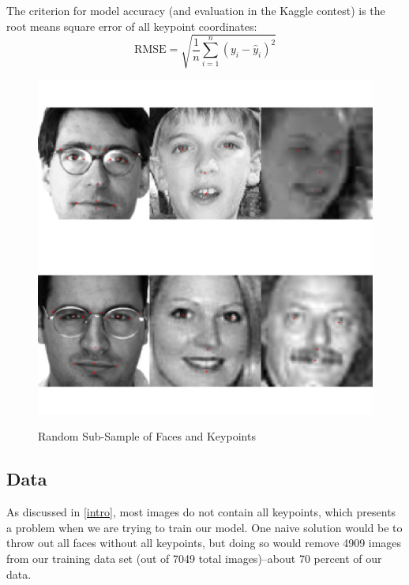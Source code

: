\documentclass[journal]{IEEEtran}
\begin{document}
The criterion for model accuracy (and evaluation in the Kaggle contest) is the root means square error of all keypoint coordinates:
\[ \text{RMSE}=\sqrt{\frac{1}{n} \sum_{i=1}^{n} \left( y_i - \hat{y}_i\right)^2} \]

\begin{figure}[!ht]
  \centering
  \caption{Random Sub-Sample of Faces and Keypoints}
  \includegraphics[scale=.6]{random_faces.pdf}
  \label{fig:random_faces}
\end{figure}

\subsection{Data}

As discussed in \cref{intro}, most images do not contain all keypoints, which presents a problem when we are trying to train our model. One naive solution would be to throw out all faces without all keypoints, but doing so would remove 4909 images from our training data set (out of 7049 total images)--about 70 percent of our data.
\end{document}
